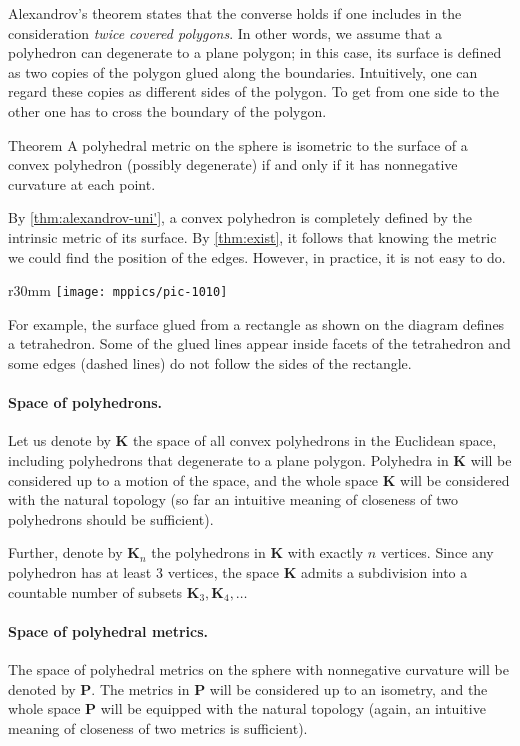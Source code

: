 Alexandrov's theorem states that the converse holds if one includes in the consideration \textit{twice covered polygons}.
In other words, we assume that a polyhedron can degenerate to a plane polygon;
in this case, its surface is defined as two copies of the polygon glued along the boundaries.
Intuitively, one can regard these copies as different sides of the polygon.
To get from one side to the other one has to cross the boundary of the polygon.

\begin{thm}{Theorem}\label{thm:exist}
A polyhedral metric on the sphere is isometric to the surface of a convex polyhedron (possibly degenerate) if and only if it has nonnegative curvature at each point.
\end{thm}

By \ref{thm:alexandrov-uni'}, a convex polyhedron is completely defined by the intrinsic metric of its surface.
By \ref{thm:exist}, it follows that knowing the metric we could find the position of the edges.
However, in practice, it is not easy to do.

\begin{wrapfigure}{r}{30mm}
\vskip-0mm
\centering
\texttt{[image: mppics/pic-1010]}
\vskip-0mm
\end{wrapfigure}

For example, the surface glued from a rectangle as shown on the diagram defines a tetrahedron.
Some of the glued lines appear inside facets of the tetrahedron and some edges (dashed lines) do not follow the sides of the rectangle.

\paragraph{Space of polyhedrons.}
Let us denote by $\mathbf{K}$ the space of all convex polyhedrons in the Euclidean space,
including polyhedrons that degenerate to a plane polygon.
Polyhedra in $\mathbf{K}$ will be considered up to a motion of the space, 
and the whole space $\mathbf{K}$ will be considered with the natural topology (so far an intuitive meaning of closeness of two polyhedrons should be sufficient). 

Further, denote by $\mathbf{K}_n$ the polyhedrons in $\mathbf{K}$ with exactly $n$ vertices.
Since any polyhedron has at least 3 vertices, the space $\mathbf{K}$ admits a subdivision into a countable number of subsets $\mathbf{K}_3,\mathbf{K}_4,\dots$

\paragraph{Space of polyhedral metrics.}
The space of polyhedral metrics on the sphere with nonnegative curvature will be denoted by $\mathbf{P}$.
The metrics in $\mathbf{P}$ will be considered up to an isometry, and the whole space $\mathbf{P}$ will be equipped with the natural topology (again, an intuitive meaning of closeness of two metrics is sufficient).

